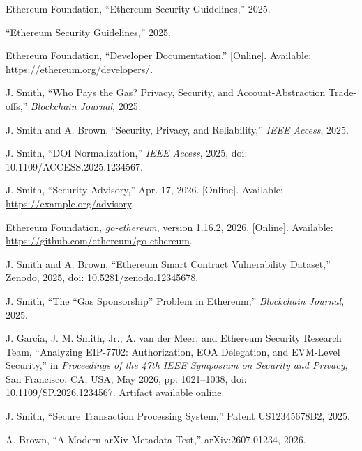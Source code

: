 Ethereum Foundation, ``Ethereum Security Guidelines,'' 2025.

``Ethereum Security Guidelines,'' 2025.

Ethereum Foundation, ``Developer Documentation.'' [Online]. Available: \url{https://ethereum.org/developers/}.

J. Smith, ``Who Pays the Gas? Privacy, Security, and Account-Abstraction Trade-offs,'' \emph{Blockchain Journal}, 2025.

J. Smith and A. Brown, ``Security, Privacy, and Reliability,'' \emph{IEEE Access}, 2025.

J. Smith, ``DOI Normalization,'' \emph{IEEE Access}, 2025, doi: 10.1109/ACCESS.2025.1234567.

J. Smith, ``Security Advisory,'' Apr. 17, 2026. [Online]. Available: \url{https://example.org/advisory}.

Ethereum Foundation, \emph{go-ethereum}, version 1.16.2, 2026. [Online]. Available: \url{https://github.com/ethereum/go-ethereum}.

J. Smith and A. Brown, ``Ethereum Smart Contract Vulnerability Dataset,'' Zenodo, 2025, doi: 10.5281/zenodo.12345678.

J. Smith, ``The ``Gas Sponsorship'' Problem in {Ethereum},'' \emph{Blockchain Journal}, 2025.

J. Garc{\'i}a, J. M. Smith, Jr., A. van der Meer, and Ethereum Security Research Team, ``Analyzing {EIP-7702}: Authorization, {EOA} Delegation, and {EVM}-Level Security,'' in \emph{Proceedings of the 47th {IEEE} Symposium on Security and Privacy}, San Francisco, CA, USA, May 2026, pp. 1021--1038, doi: 10.1109/SP.2026.1234567. Artifact available online.


J. Smith, ``Secure Transaction Processing System,'' Patent US12345678B2, 2025.

A. Brown, ``A Modern arXiv Metadata Test,'' arXiv:2607.01234, 2026.
